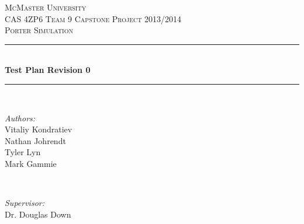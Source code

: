 \documentclass[paper=letter, fontsize=10pt]{scrartcl}
\numberwithin{equation}{section}		%
\numberwithin{figure}{section}			%
\numberwithin{table}{section}				%
\begin{document}
\begin{titlepage}

\newcommand{\HRule}{\rule{\linewidth}{0.5mm}} %

\begin{center}
 

\textsc{\LARGE McMaster University}\\[1.5cm] %
\textsc{\Large CAS 4ZP6 Team 9 Capstone Project 2013/2014}\\[0.5cm] %
\textsc{\large Porter Simulation}\\[0.5cm] %


\HRule \\[0.4cm]
{ \huge \bfseries Test Plan Revision 0}\\[0.4cm] %
\HRule \\[1.5cm]
 

\begin{minipage}{0.4\textwidth}
\begin{flushleft} \large
\emph{Authors:}\\
Vitaliy Kondratiev\\
Nathan Johrendt\\
Tyler Lyn\\
Mark Gammie
\end{flushleft}
\end{minipage}
~
\begin{minipage}{0.4\textwidth}
\begin{flushright} \large
\emph{Supervisor:} \\
Dr. Douglas Down %
\end{flushright}
\end{minipage}\\[4cm]


\end{center}
\end{titlepage}
\end{document}
